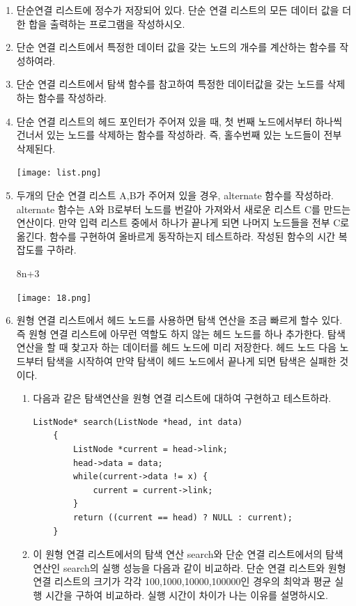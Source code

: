 \documentclass[11pt,a4paper]{article}
\begin{document}
\begin{enumerate}
\item 단순연결 리스트에 정수가 저장되어 있다. 단순 연결 리스트의 모든 데이터 값을 더한 합을 출력하는 프로그램을 작성하시오.

\item 단순 연결 리스트에서 특정한 데이터 값을 갖는 노드의 개수를 계산하는 함수를 작성하여라.

\item 단순 연결 리스트에서 탐색 함수를 참고하여 특정한 데이터값을 갖는 노드를 삭제하는 함수를 작성하라.

\item 단순 연결 리스트의 헤드 포인터가 주어져 있을 때, 첫 번째 노드에서부터 하나씩 건너서 있는 노드를 삭제하는 함수를 작성하라. 즉, 홀수번째 있는 노드들이 전부 삭제된다.

\texttt{[image: list.png]}

\item 두개의 단순 연결 리스트 A,B가 주어져 있을 경우, alternate 함수를 작성하라. alternate 함수는 A와 B로부터 노드를 번갈아 가져와서 새로운 리스트 C를 만드는 연산이다. 만약 입력 리스트 중에서 하나가 끝나게 되면 나머지 노드들을 전부 C로 옮긴다. 함수를 구현하여 올바르게 동작하는지 테스트하라. 작성된 함수의 시간 복잡도를 구하라.


8n+3

\texttt{[image: 18.png]}

\item 원형 연결 리스트에서 헤드 노드를 사용하면 탐색 연산을 조금 빠르게 할수 있다.
즉 원형 연결 리스트에 아무런 역할도 하지 않는 헤드 노드를 하나 추가한다.
탐색 연산을 할 때 찾고자 하는 데이터를 헤드 노드에 미리 저장한다.
헤드 노드 다음 노드부터 탐색을 시작하여 만약 탐색이 헤드 노드에서 끝나게 되면 탐색은 실패한 것이다.
\begin{enumerate}
	\item 다음과 같은 탐색연산을 원형 연결 리스트에 대하여 구현하고 테스트하라.
	\begin{lstlisting}[frame=none]
	ListNode* search(ListNode *head, int data)
	{
		ListNode *current = head->link;
		head->data = data;
		while(current->data != x) {
			current = current->link;
		}
		return ((current == head) ? NULL : current);
	}
	\end{lstlisting}

	\item 이 원형 연결 리스트에서의 탐색 연산 search와 단순 연결 리스트에서의 탐색 연산인 search의 실행 성능을 다음과 같이 비교하라. 
	단순 연결 리스트와 원형 연결 리스트의 크기가 각각 100,1000,10000,100000인 경우의 최악과 평균 실행 시간을 구하여 비교하라. 
	실행 시간이 차이가 나는 이유를 설명하시오.


\end{enumerate}
\end{enumerate}
\end{document}
